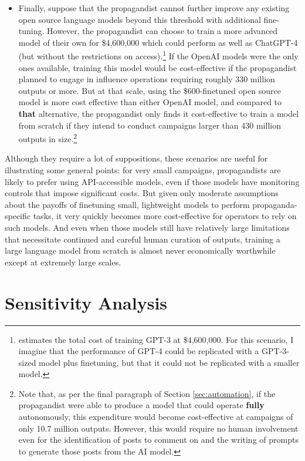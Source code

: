 \documentclass{article}
\begin{document}
\begin{itemize}
  \item Finally, suppose that the propagandist cannot further improve any existing open source language models beyond this threshold with additional fine-tuning. However, the propagandist can choose to train a more advanced model of their own for \$4,600,000 which could perform as well as ChatGPT-4 (but without the restrictions on access).\footnote{\cite{gpt3cost} estimates the total cost of training GPT-3 at \$4,600,000. For this scenario, I imagine that the performance of GPT-4 could be replicated with a GPT-3-sized model plus finetuning, but that it could not be replicated with a smaller model.} If the OpenAI models were the only ones available, training this model would be cost-effective if the propagandist planned to engage in influence operations requiring roughly 330 million outputs or more. But at that scale, using the \$600-finetuned open source model is more cost effective than either OpenAI model, and compared to \textbf{that} alternative, the propagandist only finds it cost-effective to train a model from scratch if they intend to conduct campaigns larger than 430 million outputs in size.\footnote{Note that, as per the final paragraph of Section \ref{sec:automation}, if the propagandist were able to produce a model that could operate \textbf{fully} autonomously, this expenditure would become cost-effective at campaigns of only 10.7 million outputs. However, this would require no human involvement even for the identification of posts to comment on and the writing of prompts to generate those posts from the AI model.}
\end{itemize}

Although they require a lot of suppositions, these scenarios are useful for illustrating some general points: for very small campaigns, propagandists are likely to prefer using API-accessible models, even if those models have monitoring controls that impose significant costs. But given only moderate assumptions about the payoffs of finetuning small, lightweight models to perform propaganda-specific tasks, it very quickly becomes more cost-effective for operators to rely on such models. And even when those models still have relatively large limitations that necessitate continued and careful human curation of outputs, training a large language model from scratch is almost never economically worthwhile except at extremely large scales. 

\section{Sensitivity Analysis}
\label{sec:robustness}
\end{document}
